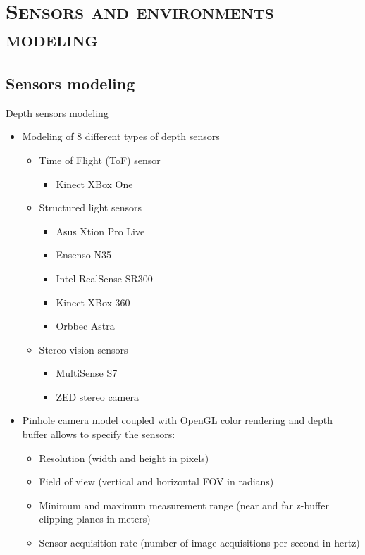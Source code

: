 \section{\scshape Sensors and environments modeling}
\subsection*{Sensors modeling}
\begin{frame}{Depth sensors modeling}
	\begin{itemize}
		\item Modeling of 8 different types of depth sensors
		\begin{itemize}
			\item Time of Flight (ToF) sensor
			\begin{itemize}
				\item Kinect XBox One
			\end{itemize}
			\item Structured light sensors
			\begin{itemize}
				\item Asus Xtion Pro Live
				\item Ensenso N35
				\item Intel RealSense SR300
				\item Kinect XBox 360
				\item Orbbec Astra
			\end{itemize}
			\item Stereo vision sensors
			\begin{itemize}
				\item MultiSense S7
				\item ZED stereo camera
			\end{itemize}
		\end{itemize}
		\item Pinhole camera model coupled with OpenGL color rendering and depth buffer allows to specify the sensors:
		\begin{itemize}
			\item Resolution (width and height in pixels)
			\item Field of view (vertical and horizontal FOV in radians)
			\item Minimum and maximum measurement range (near and far z-buffer clipping planes in meters)
			\item Sensor acquisition rate (number of image acquisitions per second in hertz)
		\end{itemize}
	\end{itemize}
\end{frame}


